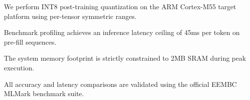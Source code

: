 
We perform INT8 post-training quantization on the ARM Cortex-M55 target platform using per-tensor symmetric ranges.

Benchmark profiling achieves an inference latency ceiling of 45ms per token on pre-fill sequences.

The system memory footprint is strictly constrained to 2MB SRAM during peak execution.

All accuracy and latency comparisons are validated using the official EEMBC MLMark benchmark suite.
